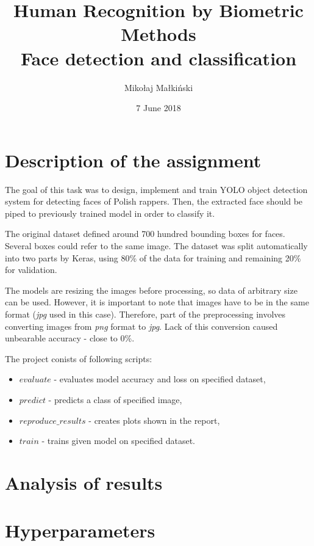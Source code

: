 \documentclass{article}
\title{
\textbf{Human Recognition by Biometric Methods}\\
\bigskip
\textbf{Face detection and classification}\\
\bigskip
}
\author{Mikołaj Małkiński}
\date{7 June 2018}
\begin{document}
    \maketitle

    \section{Description of the assignment}\label{sec:descriptionOfTheAssignment}

    The goal of this task was to design, implement and train YOLO object detection system for detecting faces of Polish rappers.
    Then, the extracted face should be piped to previously trained model in order to classify it.

    The original dataset defined around 700 hundred bounding boxes for faces.
    Several boxes could refer to the same image.
    The dataset was split automatically into two parts by Keras, using 80\% of the data for training and remaining 20\% for validation.

    The models are resizing the images before processing, so data of arbitrary size can be used.
    However, it is important to note that images have to be in the same format (\textit{jpg} used in this case).
    Therefore, part of the preprocessing involves converting images from \textit{png} format to \textit{jpg}.
    Lack of this conversion caused unbearable accuracy - close to 0\%.

    The project conists of following scripts:
    \begin{itemize}
        \item $evaluate$ - evaluates model accuracy and loss on specified dataset,
        \item $predict$ - predicts a class of specified image,
        \item $reproduce\_results$ - creates plots shown in the report,
        \item $train$ - trains given model on specified dataset.
    \end{itemize}

    \section{Analysis of results}\label{sec:analysisOfResults}


    \section{Hyperparameters}\label{sec:hyperparameters}
\end{document}
